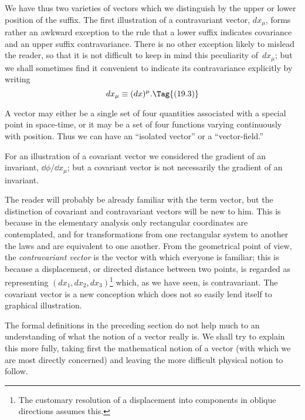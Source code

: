 \documentclass[12pt]{book}
\begin{document}
We have thus two varieties of vectors which we distinguish by the upper
or lower position of the suffix. The first illustration of a contravariant vector,
%
%
$dx_{\mu}$, forms rather an awkward exception to the rule that a lower suffix indicates
covariance and an upper suffix contravariance. There is no other
exception likely to mislead the reader, so that it is not difficult to keep in
mind this peculiarity of~$dx_{\mu}$; but we shall sometimes find it convenient to
indicate its contravariance explicitly by writing
\[
dx_{\mu} \equiv (dx)^{\mu}.
\Tag{(19.3)}
\]

A vector may either be a single set of four quantities associated with
a special point in space-time, or it may be a set of four functions varying
continuously with position. Thus we can have an ``isolated vector'' or a
``vector-field.''

For an illustration of a covariant vector we considered the gradient of an
invariant, $\dd\phi/\dd x_{\mu}$; but a covariant vector is not necessarily the gradient of an
invariant.

The reader will probably be already familiar with the term vector, but
the distinction of covariant and contravariant vectors will be new to him.
This is because in the elementary analysis only rectangular coordinates are
contemplated, and for transformations from one rectangular system to another
the laws  and  are equivalent to one another. From the geometrical
point of view, the \emph{contravariant vector} is the vector with which everyone is
familiar; this is because a displacement, or directed distance between two
points, is regarded as representing $(dx_{1}, dx_{2}, dx_{3})$\footnote
  {The customary resolution of a displacement into components in oblique directions assumes
  this.}
which, as we have seen, is
contravariant. The covariant vector is a new conception which does not so
easily lend itself to graphical illustration.


The formal definitions in the preceding section do not help much to
an understanding of what the notion of a vector really is. We shall try to
explain this more fully, taking first the mathematical notion of a vector (with
which we are most directly concerned) and leaving the more difficult physical
notion to follow.
\end{document}

